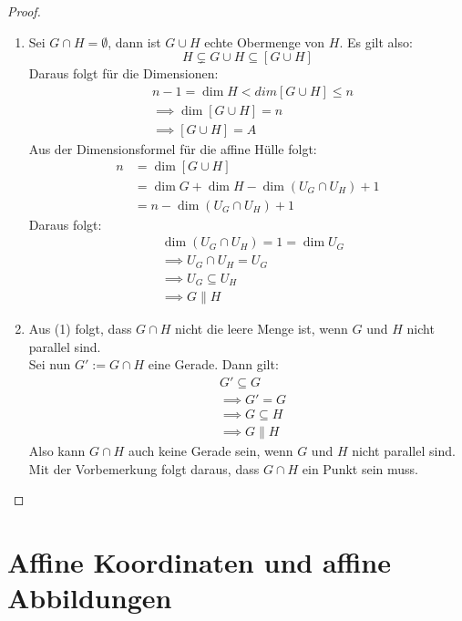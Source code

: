 \documentclass[parskip,a4paper,twoside,DIV15,BCOR12mm]{scrbook}
\begin{document}
\begin{proof}
\begin{enumerate}
\item Sei $G\cap H=\emptyset$, dann ist $G\cup H$ echte Obermenge von $H$. Es gilt also:
\[H \subsetneq G\cup H \subseteq [G\cup H]\]
Daraus folgt für die Dimensionen:
\begin{align*}
&n-1=\dim H < dim[G\cup H]\le n\\
&\implies \dim[G\cup H]=n\\
&\implies [G\cup H]=A
\end{align*}
Aus der Dimensionsformel für die affine Hülle folgt:
\begin{align*}
n&=\dim[G\cup H]\\
&= \dim G+\dim H -\dim(U_G\cap U_H)+1\\
&= n-\dim(U_G\cap U_H)+1
\end{align*}
Daraus folgt:
\begin{align*}
&\dim(U_G\cap U_H)=1=\dim U_G\\
&\implies U_G\cap U_H = U_G\\
&\implies U_G \subseteq U_H\\
&\implies G\parallel H
\end{align*}
\item Aus (1) folgt, dass $G\cap H$ nicht die leere Menge ist, wenn $G$ und $H$ nicht
parallel sind.\\
Sei nun $G':=G\cap H$ eine Gerade. Dann gilt:
\begin{align*}
&G'\subseteq G\\
&\implies G'=G\\
&\implies G\subseteq H\\
&\implies G\parallel H
\end{align*}
Also kann $G\cap H$ auch keine Gerade sein, wenn $G$ und $H$ nicht parallel sind. Mit der
Vorbemerkung folgt daraus, dass $G\cap H$ ein Punkt sein muss.
\end{enumerate}
\end{proof}

\chapter{Affine Koordinaten und affine Abbildungen}
\end{document}
